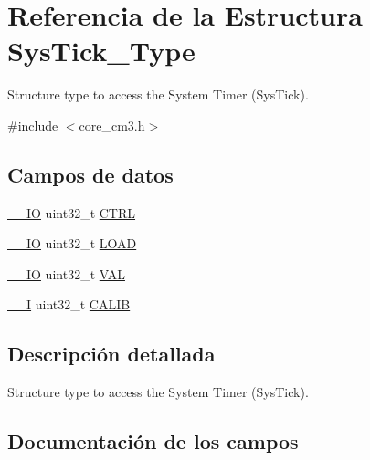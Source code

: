 \hypertarget{struct_sys_tick___type}{}\section{Referencia de la Estructura Sys\+Tick\+\_\+\+Type}
\label{struct_sys_tick___type}


Structure type to access the System Timer (Sys\+Tick).  




{\ttfamily \#include $<$core\+\_\+cm3.\+h$>$}

\subsection*{Campos de datos}
\begin{DoxyCompactItemize}
\item 
\mbox{\hyperlink{core__cm3_8h_aec43007d9998a0a0e01faede4133d6be}{\+\_\+\+\_\+\+IO}} uint32\+\_\+t \mbox{\hyperlink{struct_sys_tick___type_a15fc8d35f045f329b80c544bef35ff64}{C\+T\+RL}}
\item 
\mbox{\hyperlink{core__cm3_8h_aec43007d9998a0a0e01faede4133d6be}{\+\_\+\+\_\+\+IO}} uint32\+\_\+t \mbox{\hyperlink{struct_sys_tick___type_aad9adf4efc940cddb8161b69cfbe19d3}{L\+O\+AD}}
\item 
\mbox{\hyperlink{core__cm3_8h_aec43007d9998a0a0e01faede4133d6be}{\+\_\+\+\_\+\+IO}} uint32\+\_\+t \mbox{\hyperlink{struct_sys_tick___type_a26fb318c3b0a0ec7f45daafd5f8799a3}{V\+AL}}
\item 
\mbox{\hyperlink{core__cm3_8h_af63697ed9952cc71e1225efe205f6cd3}{\+\_\+\+\_\+I}} uint32\+\_\+t \mbox{\hyperlink{struct_sys_tick___type_a40e07d0a4638a676780713b6ceeec4ef}{C\+A\+L\+IB}}
\end{DoxyCompactItemize}


\subsection{Descripción detallada}
Structure type to access the System Timer (Sys\+Tick). 

\subsection{Documentación de los campos}
\mbox{\label{struct_sys_tick___type_a40e07d0a4638a676780713b6ceeec4ef}} 
